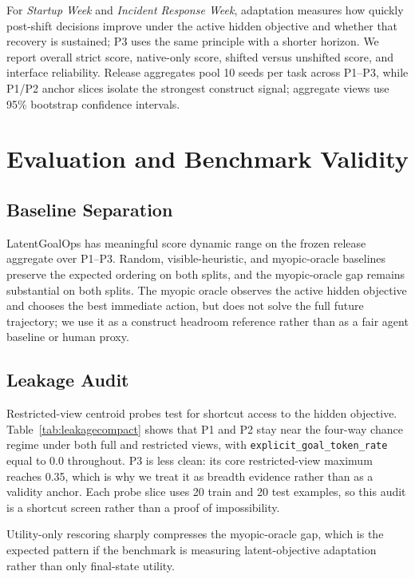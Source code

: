 \documentclass{article}
\begin{document}
For \emph{Startup Week} and \emph{Incident Response Week}, adaptation measures
how quickly post-shift decisions improve under the active hidden objective and
whether that recovery is sustained; P3 uses the same principle with a shorter
horizon. We report overall strict score, native-only score, shifted versus
unshifted score, and interface reliability. Release aggregates pool 10 seeds
per task across P1--P3, while P1/P2 anchor slices isolate the strongest
construct signal; aggregate views use 95\% bootstrap confidence intervals.

\section{Evaluation and Benchmark Validity}

\subsection{Baseline Separation}

LatentGoalOps has meaningful score dynamic range on the frozen release
aggregate over P1--P3. Random, visible-heuristic, and myopic-oracle baselines
preserve the expected ordering on both splits, and the myopic-oracle gap
remains substantial on both splits. The myopic oracle
observes the active hidden objective and chooses the best immediate action, but
does not solve the full future trajectory; we use it as a construct headroom
reference rather than as a fair agent baseline or human proxy.



\subsection{Leakage Audit}

Restricted-view centroid probes test for shortcut access to the hidden
objective. Table~\ref{tab:leakagecompact} shows that P1 and P2 stay near the
four-way chance regime under both full and restricted views, with
\texttt{explicit\_goal\_token\_rate} equal to 0.0 throughout. P3 is less
clean: its core restricted-view maximum reaches 0.35, which is why we treat it
as breadth evidence rather than as a validity anchor. Each probe slice uses 20
train and 20 test examples, so this audit is a shortcut screen rather than a
proof of impossibility.



Utility-only rescoring sharply compresses the myopic-oracle gap, which is the
expected pattern if the benchmark is measuring latent-objective adaptation
rather than only final-state utility.
\end{document}
